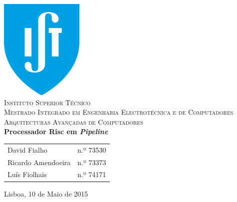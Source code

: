 \begin{titlepage}
	\begin{center}
		\hfill \break
		\hfill \break
		\includegraphics[width=0.3\textwidth]{./logo}~\\[1cm]
		\textsc{\LARGE Instituto Superior Técnico}\\[0.25cm]
		\textsc{\Large Mestrado Integrado em Engenharia Electrotécnica e de Computadores}\\[1.8cm]
		\textsc{\huge Arquitecturas Avançadas de Computadores}\\[0.25cm]
		{\huge \bfseries  Processador \textmu Risc em \textit{Pipeline}\\[1cm]}
		\begin{tabular}{ l l }
			David Fialho & \hspace{2mm} n.º 73530 \\
			Ricardo Amendoeira & \hspace{2mm} n.º 73373 \\
			Luís Fiolhais & \hspace{2mm} n.º 74171
		\end{tabular}
		\vfill
		{\large Lisboa, 10 de Maio de 2015}
	\end{center}
\end{titlepage}
\pagebreak